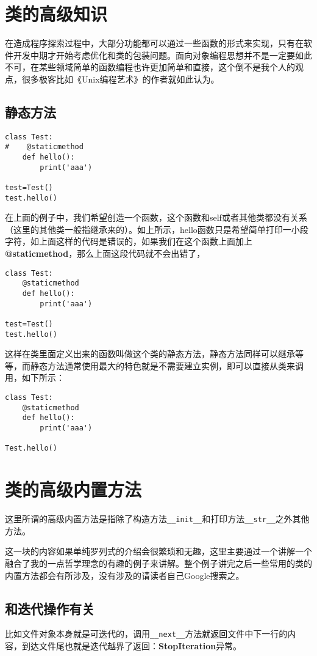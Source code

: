 \documentclass[12pt,oneside]{book}
\begin{document}
\begin{common-format}
\chapter{类的高级知识}
在造成程序探索过程中，大部分功能都可以通过一些函数的形式来实现，只有在软件开发中期才开始考虑优化和类的包装问题。面向对象编程思想并不是一定要如此不可，在某些领域简单的函数编程也许更加简单和直接，这个倒不是我个人的观点，很多极客比如《Unix编程艺术》的作者就如此认为。



\section{静态方法}
\begin{Verbatim}
class Test:
#    @staticmethod
    def hello():
        print('aaa')

test=Test()
test.hello()
\end{Verbatim}
在上面的例子中，我们希望创造一个函数，这个函数和self或者其他类都没有关系（这里的其他类一般指继承来的）。如上所示，hello函数只是希望简单打印一小段字符，如上面这样的代码是错误的，如果我们在这个函数上面加上\textbf{@staticmethod}，那么上面这段代码就不会出错了，

\begin{Verbatim}
class Test:
    @staticmethod
    def hello():
        print('aaa')

test=Test()
test.hello()
\end{Verbatim}
这样在类里面定义出来的函数叫做这个类的静态方法，静态方法同样可以继承等等，而静态方法通常使用最大的特色就是不需要建立实例，即可以直接从类来调用，如下所示：
\begin{Verbatim}
class Test:
    @staticmethod
    def hello():
        print('aaa')

Test.hello()
\end{Verbatim}

\chapter{类的高级内置方法}
\label{sec:类的高级内置方法}
这里所谓的高级内置方法是指除了构造方法\verb+__init__+和打印方法\verb+__str__+之外其他方法。

这一块的内容如果单纯罗列式的介绍会很繁琐和无趣，这里主要通过一个讲解一个融合了我的一点哲学理念的有趣的例子来讲解。整个例子讲完之后一些常用的类的内置方法都会有所涉及，没有涉及的请读者自己Google搜索之。



\section{和迭代操作有关}
比如文件对象本身就是可迭代的，调用\verb+__next__+方法就返回文件中下一行的内容，到达文件尾也就是迭代越界了返回：\textbf{StopIteration}异常。


\end{common-format}
\end{document}
